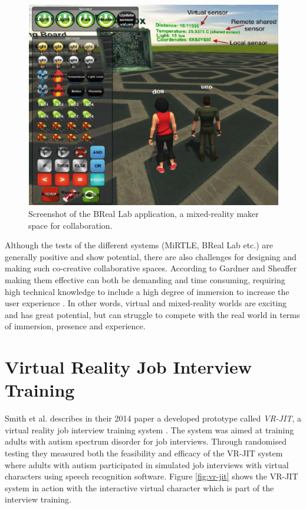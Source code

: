 \begin{figure}[!ht]
     \centering
     \includegraphics[width=.7\textwidth]{./fig/related_work/BReal.PNG}
     \captionsetup{width=0.6\linewidth}
     \caption{Screenshot of the BReal Lab application, a mixed-reality maker space for collaboration.}
     \label{fig:BReal}
 \end{figure}
 
 
 Although the tests of the different systems (MiRTLE, BReal Lab etc.) are generally positive and show  potential, there are also challenges for designing and making such co-creative collaborative spaces. According to Gardner and Sheaffer making them effective can both be demanding and time consuming, requiring high technical knowledge to include a high degree of immersion to increase the user experience \cite{gardner2017systems}. In other words, virtual and mixed-reality worlds are exciting and has great potential, but can struggle to compete with the real world in terms of immersion, presence and experience.          


\section{Virtual Reality Job Interview Training}
Smith et al. describes in their 2014 paper a developed prototype called \textit{VR-JIT}, a virtual reality job interview training system \cite{smith2014virtual}. The system was aimed at training adults with autism spectrum disorder for job interviews. Through randomised testing they measured both the feasibility and efficacy of the VR-JIT system where adults with autism participated in simulated job interviews with virtual characters using speech recognition software. Figure \ref{fig:vr-jit} shows the VR-JIT system in action with the interactive virtual character which is part of the interview training.   


